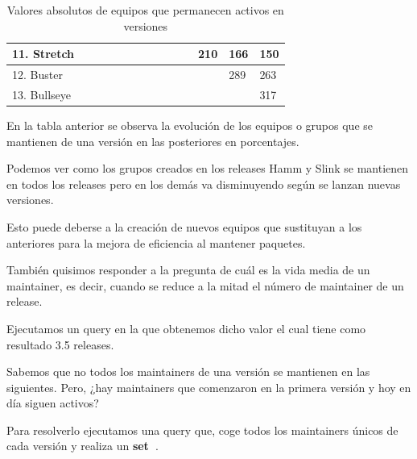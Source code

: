 \documentclass[a4paper, 12pt]{book}
\begin{document}
\begin{table}[htbp]
{\begin{tabular}{|l|l|l|l|l|l|l|l|l|l|l|l|l|l|}
			11. Stretch  & \cellcolor[HTML]{000000} & \cellcolor[HTML]{000000} & \cellcolor[HTML]{000000} & \cellcolor[HTML]{000000} & \cellcolor[HTML]{000000} & \cellcolor[HTML]{000000} & \cellcolor[HTML]{000000} & \cellcolor[HTML]{000000} & \cellcolor[HTML]{000000} & \cellcolor[HTML]{000000} & 210 & 166 & 150 \\ \hline
			12. Buster   & \cellcolor[HTML]{000000} & \cellcolor[HTML]{000000} & \cellcolor[HTML]{000000} & \cellcolor[HTML]{000000} & \cellcolor[HTML]{000000} & \cellcolor[HTML]{000000} & \cellcolor[HTML]{000000} & \cellcolor[HTML]{000000} & \cellcolor[HTML]{000000} & \cellcolor[HTML]{000000} & \cellcolor[HTML]{000000} & 289 & 263 \\ \hline
			13. Bullseye & \cellcolor[HTML]{000000} & \cellcolor[HTML]{000000} & \cellcolor[HTML]{000000} & \cellcolor[HTML]{000000} & \cellcolor[HTML]{000000} & \cellcolor[HTML]{000000} & \cellcolor[HTML]{000000} & \cellcolor[HTML]{000000} & \cellcolor[HTML]{000000} & \cellcolor[HTML]{000000} & \cellcolor[HTML]{000000} & \cellcolor[HTML]{000000} & 317 \\ \hline
	\end{tabular}}
	\caption{Valores absolutos de equipos que permanecen activos en versiones}
\end{table}





En la tabla anterior se observa la evolución de los equipos o grupos que se mantienen de una versión en las posteriores en porcentajes.

Podemos ver como los grupos creados en los releases Hamm y Slink se mantienen en todos los releases pero en los demás va disminuyendo según se lanzan nuevas versiones.

Esto puede deberse a la creación de nuevos equipos que sustituyan a los anteriores para la mejora de eficiencia al mantener paquetes.

También quisimos responder a la pregunta de cuál es la vida media de un maintainer, es decir, cuando se reduce a la mitad el número de maintainer de un release. 

Ejecutamos un query en la que obtenemos dicho valor el cual tiene como resultado 3.5 releases.

Sabemos que no todos los maintainers de una versión se mantienen en las siguientes. Pero, ¿hay maintainers que comenzaron en la primera versión y hoy en día siguen activos?

Para resolverlo ejecutamos una query que, coge todos los maintainers únicos de cada versión y realiza un \textbf{set~\cite{ellibrodepython:_set}}.
\end{document}

